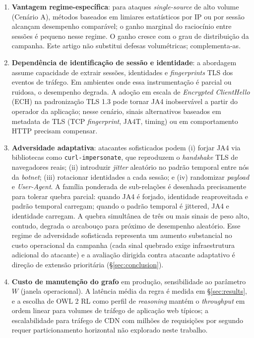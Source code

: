 \documentclass[preprint,12pt]{elsarticle}
\begin{document}
\begin{enumerate}
    \item \textbf{Vantagem regime-específica}: para ataques \emph{single-source} de alto volume (Cenário A), métodos baseados em limiares estatísticos por IP ou por sessão alcançam desempenho comparável; o ganho marginal do raciocínio entre sessões é pequeno nesse regime. O ganho cresce com o grau de distribuição da campanha. Este artigo não substitui defesas volumétricas; complementa-as.

    \item \textbf{Dependência de identificação de sessão e identidade}: a abordagem assume capacidade de extrair sessões, identidades e \emph{fingerprints} TLS dos eventos de tráfego. Em ambientes onde essa instrumentação é parcial ou ruidosa, o desempenho degrada. A adoção em escala de \emph{Encrypted ClientHello} (ECH) na padronização TLS 1.3 pode tornar JA4 inobservável a partir do operador da aplicação; nesse cenário, sinais alternativos baseados em metadata de TLS (TCP \emph{fingerprint}, JA4T, timing) ou em comportamento HTTP precisam compensar.

    \item \textbf{Adversidade adaptativa}: atacantes sofisticados podem (i) forjar JA4 via bibliotecas como \texttt{curl-impersonate}, que reproduzem o \emph{handshake} TLS de navegadores reais; (ii) introduzir \emph{jitter} aleatório no padrão temporal entre nós da \emph{botnet}; (iii) rotacionar identidades a cada sessão; e (iv) randomizar \emph{payload} e \emph{User-Agent}. A família ponderada de sub-relações é desenhada precisamente para tolerar quebra parcial: quando JA4 é forjado, identidade reaproveitada e padrão temporal carregam; quando o padrão temporal é jittered, JA4 e identidade carregam. A quebra simultânea de três ou mais sinais de peso alto, contudo, degrada o arcabouço para próximo de desempenho aleatório. Esse regime de adversidade sofisticada representa um aumento substancial no custo operacional da campanha (cada sinal quebrado exige infraestrutura adicional do atacante) e a avaliação dirigida contra atacante adaptativo é direção de extensão prioritária (§\ref{sec:conclusion}).

    \item \textbf{Custo de manutenção do grafo} em produção, sensibilidade ao parâmetro $W$ (janela operacional). A latência média da regra é medida em §\ref{sec:results}, e a escolha de OWL 2 RL como perfil de \emph{reasoning} mantém o \emph{throughput} em ordem linear para volumes de tráfego de aplicação web típicos; a escalabilidade para tráfego de CDN com milhões de requisições por segundo requer particionamento horizontal não explorado neste trabalho.


\end{enumerate}
\end{document}
